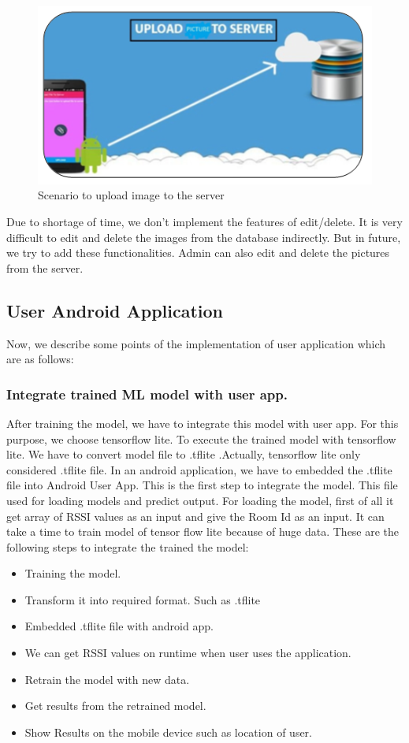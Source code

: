 \begin{figure}[h]
  		\centering
    		\includegraphics[scale=0.75]{./Figures/uploadimage}
\caption{Scenario to upload image to the server}
\label{fig:16}
 		\end{figure}


Due to shortage of time, we don’t implement the features of edit/delete. It is very difficult to edit and delete the images from the database indirectly. But in future, we try to add these functionalities. Admin can also edit and delete the pictures from the server.

\subsection{User Android Application}
Now, we describe some points of the implementation of user application which are as follows:

\subsubsection{Integrate trained ML model with user app.}
After training the model, we have to integrate this model with user app. For this purpose, we choose tensorflow lite. To execute the trained model with tensorflow lite. We have to convert model file to .tflite .Actually, tensorflow lite only considered .tflite file.
In an android application, we have to embedded the .tflite file into Android User App. This is the first step to integrate the model. This file used for loading models and predict output. For loading the model, first of all it get array of RSSI values as an input and give the Room Id as an input. It can take a time to train model of tensor flow lite because of huge data. 
These are the following steps to integrate the trained the model:
\begin{itemize}
\item Training the model.
\item Transform it into required format. Such as .tflite
\item Embedded .tflite file with android app.
\item We can get RSSI values on runtime when user uses the application.
\item Retrain the model with new data.
\item Get results from the retrained model.
\item Show Results on the mobile device such as location of user.
\end{itemize}

